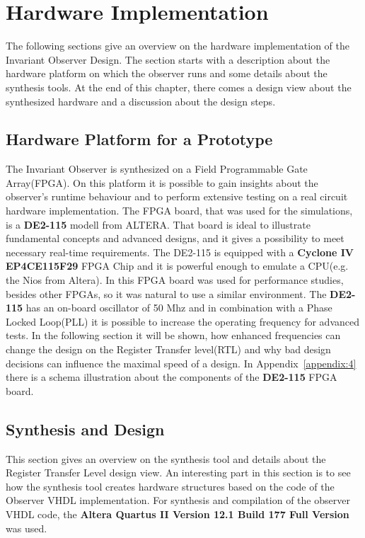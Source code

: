 \chapter{Hardware Implementation}
\label{chapter:3}
\ifpdf
    \graphicspath{{Chapter3/Figs/Raster/}{Chapter3/Figs/PDF/}{Chapter3/Figs/}}
\else
    \graphicspath{{Chapter3/Figs/Vector/}{Chapter3/Figs/}}
\fi


The following sections give an overview on the hardware implementation of the Invariant Observer Design. 
The section starts with a description about the hardware platform on which the observer runs and some details
about the synthesis tools. 
At the end of this chapter, there comes a design view about the synthesized hardware and a discussion about 
the design steps. 
\section{Hardware Platform for a Prototype}
\label{chapter:3:section:1}
The Invariant Observer is synthesized on a Field Programmable Gate Array(FPGA). On this platform it is possible to gain insights
about the observer's runtime behaviour and to perform extensive testing on a real circuit hardware implementation.
The FPGA board, that was used for the simulations, is a \textbf{DE2-115} modell from ALTERA\cite{altera1}.
 That board is ideal to illustrate fundamental concepts and advanced designs, and it gives a possibility
to meet necessary real-time requirements. 
The DE2-115 is equipped with a \textbf{Cyclone IV EP4CE115F29} FPGA Chip and it is powerful enough to emulate a CPU(e.g. the Nios from Altera). 
In \cite{RTFMBJ13} this FPGA board was used for performance studies, besides other FPGAs, so it was natural to use a similar environment. 
The \textbf{DE2-115} has an on-board oscillator of 50 Mhz and in combination with a Phase Locked Loop(PLL) it is possible to increase the operating frequency for advanced tests. 
In the following section it will be shown, how enhanced frequencies can change the design on the Register Transfer level(RTL) and why bad design decisions 
can influence the maximal speed of a design. 
In Appendix~\ref{appendix:4} there is a schema illustration about the components of the \textbf{DE2-115} FPGA board. 


\section{Synthesis and Design}
\label{chapter:3:section:2}
This section gives an overview on the synthesis tool and details about the Register Transfer Level design view. 
An interesting part in this section is to see how the synthesis tool creates hardware structures based on the code of the
Observer VHDL implementation. \newline
For synthesis and compilation of the observer VHDL code, the \textbf{Altera Quartus II Version 12.1 Build 177 Full Version} was used. 

